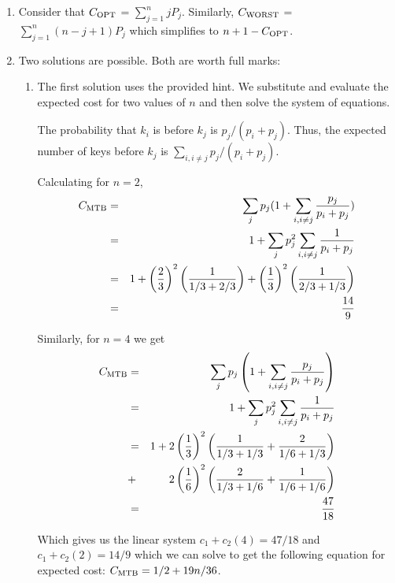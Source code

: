 \begin{solution}
\begin{enumerate}

  \item Consider that $C_{\hbox{\scriptsize OPT}}$ = $\sum_{j=1}^{n} j  P_j$.
%
  Similarly, $C_{\hbox{\scriptsize WORST}}$ = $\sum_{j=1}^{n} (n - j + 1)P_j$ 
  which simplifies to $n+1-C_{\hbox{\scriptsize OPT}}$.


  \item Two solutions are possible. Both are worth full marks:
     \begin{enumerate}
	\item The first solution uses the provided hint. We substitute and evaluate 
	the expected cost for two values of $n$ and then solve the system of equations.

	The probability that $k_i$ is before $k_j$ is $p_j/(p_i+p_j)$.
	Thus, the expected number
	of keys before $k_j$ is $\sum_{i,i\neq j} p_j/(p_i+p_j)$. 

	Calculating for $n=2$, 
	 \begin{eqnarray*}
	 C_{\hbox{\scriptsize MTB}} &= & 
	  \sum_j p_j(1+ \sum_{i,i\neq j} \frac{p_j}{p_i+p_j})\\
	  & = & 1 + \sum_j p_j^2 \sum_{i,i\neq j} \frac{1}{p_i+p_j}\\
	  & = & 1 + \left (\frac{2}{3}\right )^2 \left (\frac{1}{1/3 + 
                     2/3}\right ) 
   		  + \left (\frac{1}{3}\right )^2 \left (\frac{1}{2/3 + 1/3}
                    \right )   \\
	  & = & \frac{14}{9} 
	 \end{eqnarray*}

	Similarly, for $n=4$ we get
	 \begin{eqnarray*}
	 C_{\hbox{\scriptsize MTB}} &= & 
	  \sum_j p_j\left (1+ \sum_{i,i\neq j} \frac{p_j}{p_i+p_j}\right)\\
	  & = & 1 + \sum_j p_j^2 \sum_{i,i\neq j} \frac{1}{p_i+p_j}\\
	  & = & 1 + 2\left (\frac{1}{3}\right )^2 \left (\frac{1}{1/3 + 1/3} + \frac{2}{1/6 + 1/3}\right) \\ 
          & + &	2\left (\frac{1}{6}\right )^2 \left(\frac{2}{1/3 + 1/6} + \frac{1}{1/6 + 1/6}\right)   \\
	  & = & \frac{47}{18} 
	 \end{eqnarray*}

	 Which gives us the linear system $c_1 + c_2(4) = 47/18$ and
 $c_1 + c_2(2) = 14/9$		
	 which we can solve to get the following equation for expected cost: 
	  $C_{\hbox{\scriptsize MTB}} = 1/2 + 19n/36$.


\end{enumerate}
\end{enumerate}
\end{solution}
